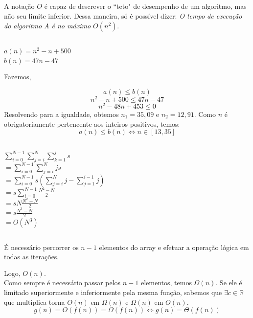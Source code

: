 \subsection{}
A notação $O$ é capaz de descrever o ``teto" de desempenho de um algoritmo, mas não seu limite inferior. 
Dessa maneira, só é possível dizer: \textit{O tempo de execução do algoritmo A é no máximo $O(n^2)$}.

\subsection{}
$a(n) = n^2-n+500$ \\
$b(n) = 47n-47$

Fazemos, 

$$a(n) \leq b(n)$$
$$ n^2-n+500 \leq 47n-47 $$
$$n^2-48n + 453 \leq 0$$
Resolvendo para a igualdade, obtemos $n_1 = 35,09$ e $n_2 = 12,91$. Como $n$ é obrigatoriamente pertencente aos inteiros positivos, temos: \\
$$a(n) \leq b(n)  \Leftrightarrow n \in \left[ 13,35 \right] $$

\subsection{}
$\sum_{i = 0}^{N-1} \sum_{j=i}^{N} \sum_{k=1}^{j} s$\\
$= \sum_{i = 0}^{N-1} \sum_{j=i}^{N} js$\\
$= \sum_{i = 0}^{N-1}  s ( \sum_{j=i}^{N} j  - \sum_{j=1}^{i-1}j)$\\
$= s \sum_{i = 0}^{N-1}  \frac{N^2 - N}{2} $\\
$= s N  \frac{N^2 - N}{2} $\\
$= s \frac{N^3 - N}{2} $\\
$\displaystyle = O(N^3)$

\subsection{}
É necessário percorrer os $n-1$ elementos do array e efetuar a operação lógica em todas as iterações. 

Logo, $O(n)$. \\
Como sempre é necessário passar pelos $n-1$ elementos, temos $\Omega(n)$. 
Se ele é limitado superiormente e inferiormente pela mesma função, sabemos que $\exists c \in \mathbb{R}$ que multiplica torna $O(n)$ em $\Omega(n)$ e $\Omega(n)$ em $O(n)$. 
$$g(n) = O(f(n)) = \Omega(f(n)) \Leftrightarrow g(n) = \Theta(f(n))$$
